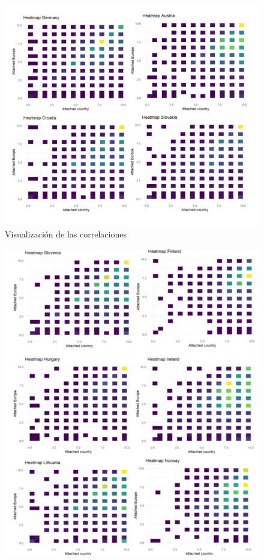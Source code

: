 \documentclass{article}
\begin{document}
 \begin{figure}[H]
 \centering
 \includegraphics[width=1\textwidth]{Imatge3.png}
 \caption{Visualización de las correlaciones}
 \end{figure}

 \begin{figure}[H]
 \centering
 \includegraphics[width=1\textwidth]{Imatge4.png}
 \caption{}
 \end{figure}
\end{document}
